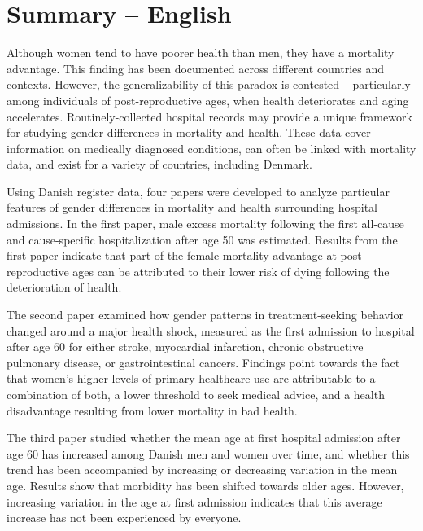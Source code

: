 



\chapter{Summary -- English}

Although women tend to have poorer health than men, they have 
a mortality advantage. This finding has been documented across 
different countries and contexts. However, the generalizability 
of this paradox is contested -- particularly among individuals of 
post-reproductive ages, when health deteriorates and aging accelerates. 
Routinely-collected hospital records may provide a unique framework 
for studying gender differences in mortality and health. These 
data cover information on medically diagnosed conditions, can often 
be linked with mortality data, and exist for a variety of countries, 
including Denmark. 

Using Danish register data, four papers were developed to analyze 
particular features of gender differences in mortality and health 
surrounding hospital admissions. In the first paper, male excess 
mortality following the first all-cause and cause-specific hospitalization 
after age 50 was estimated. Results from the first paper indicate 
that part of the female mortality advantage at post-reproductive 
ages can be attributed to their lower risk of dying following the 
deterioration of health.

The second paper examined how gender patterns in treatment-seeking 
behavior changed around a major health shock, measured as the first 
admission to hospital after age 60 for either stroke, myocardial 
infarction, chronic obstructive pulmonary disease, or gastrointestinal 
cancers. Findings point towards the fact that women's higher levels 
of primary healthcare use are attributable to a combination of both, 
a lower threshold to seek medical advice, and a health disadvantage 
resulting from lower mortality in bad health.

The third paper studied whether the mean age at first hospital admission 
after age 60 has increased among Danish men and women over time, and 
whether this trend has been accompanied by increasing or decreasing 
variation in the mean age. Results show that morbidity has been shifted 
towards older ages. However, increasing variation in the age at first 
admission indicates that this average increase has not been experienced 
by everyone.

